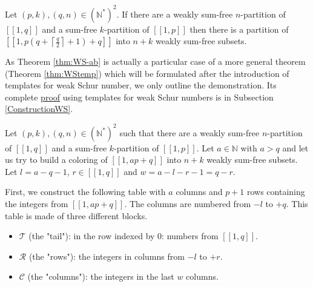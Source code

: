 \documentclass[final,onefignum,onetabnum]{siamart190516}
\begin{document}
\begin{theorem}
\label{thm:WS-ab}
\begin{sloppypar}
Let \((p,k), (q,n) \in (\mathbb{N}^*)^2\). If there are a weakly sum-free \(n\)-partition of \([\![1,q]\!]\)
and a sum-free \(k\)-partition of \([\![1,p]\!]\) then there is a partition of
\({[\![1,p(q+\left \lceil \frac{q}{2} \right \rceil + 1)+q]\!]}\) into \(n+k\) weakly sum-free subsets.
\end{sloppypar}
\end{theorem}

As Theorem \ref{thm:WS-ab} is actually a particular case of a more general theorem (Theorem \ref{thm:WStemp}) which will
be formulated after the introduction of templates for weak Schur number,
we only outline the demonstration. Its complete \hyperref[PreuveThm]{proof} using templates 
for weak Schur numbers is in Subsection \ref{ConstructionWS}.

Let \((p, k), (q, n) \in (\mathbb{N}^*)^2\) such that there are a weakly sum-free \(n\)-partition of \([\![1,q]\!]\) 
and a sum-free \(k\)-partition of \([\![1,p]\!]\). Let \(a \in \mathbb{N}\) with \(a > q\)
and let us try to build a coloring of \([\![1, ap + q]\!]\) into \(n + k\) weakly sum-free subsets. Let
\(l = a - q - 1\), \(r \in [\![1,q]\!]\) and \(w = a - l - r - 1 = q - r\).

First, we construct the following table with \(a\) columns and \(p+1\) rows containing the integers from \([\![1, ap + q]\!]\). 
The columns are numbered from \(-l\) to \(+q\). This table is made of three different blocks.

\begin{itemize}
	\item \(\mathcal{T}\) (the "tail"): in the row indexed by 0: numbers from \([\![1,q]\!]\).
	\item \(\mathcal{R}\) (the "rows"): the integers in columns from \(-l\) to \(+r\).
	\item \(\mathcal{C}\) (the "columns"): the integers in the last \(w\) columns.
\end{itemize}

\setlength{\arraycolsep}{2pt}
\end{document}
